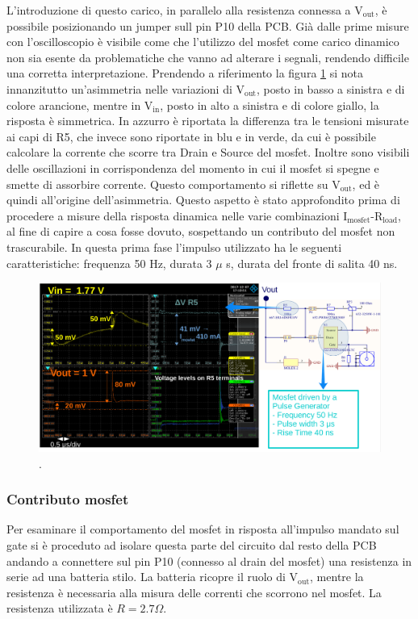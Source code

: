 L'introduzione di questo carico, in parallelo alla resistenza connessa a $\mathrm{V_{out}}$, è possibile posizionando un jumper sull pin P10 della PCB. Già dalle prime misure con l'oscilloscopio è visibile come che l'utilizzo del mosfet come carico dinamico non sia esente da problematiche che vanno ad alterare i segnali, rendendo difficile una corretta interpretazione. 
Prendendo a riferimento la figura \ref{TransientTest} si nota innanzitutto un'asimmetria nelle variazioni di $\mathrm{V_{out}}$, posto in basso a sinistra e di colore arancione, mentre in $\mathrm{V_{in}}$, posto in alto a sinistra e di colore giallo, la risposta è simmetrica. In azzurro è riportata la differenza tra le tensioni misurate ai capi di R5, che invece sono riportate in blu e in verde, da cui è possibile calcolare la corrente che scorre tra Drain e Source del mosfet. 
Inoltre sono visibili delle oscillazioni in corrispondenza del momento in cui il mosfet si spegne e smette di assorbire corrente. Questo comportamento si riflette su $\mathrm{V_{out}}$, ed è quindi all'origine dell'asimmetria. Questo aspetto è stato approfondito prima di procedere a misure della risposta dinamica nelle varie combinazioni $\mathrm{I_{mosfet}}$-$\mathrm{R_{load}}$, al fine di capire a cosa fosse dovuto, sospettando un contributo del mosfet non trascurabile.
In questa prima fase l'impulso utilizzato ha le seguenti caratteristiche: frequenza 50 Hz, durata 3 $\mu$ s, durata del fronte di salita 40 ns.
\begin{figure}
\centering
\includegraphics[scale=.2]{Immagini/TransientTest}
\caption{.}
\label{TransientTest}
\end{figure}

\subsubsection{Contributo mosfet}
Per esaminare il comportamento del mosfet in risposta all'impulso mandato sul gate si è proceduto ad isolare questa parte del circuito dal resto della PCB andando a connettere sul pin P10 (connesso al drain del mosfet) una resistenza in serie ad una batteria stilo. La batteria ricopre il ruolo di $\mathrm{V_{out}}$, mentre la resistenza è necessaria alla misura delle correnti che scorrono nel mosfet. La resistenza utilizzata è $R=2.7 \Omega$. 

